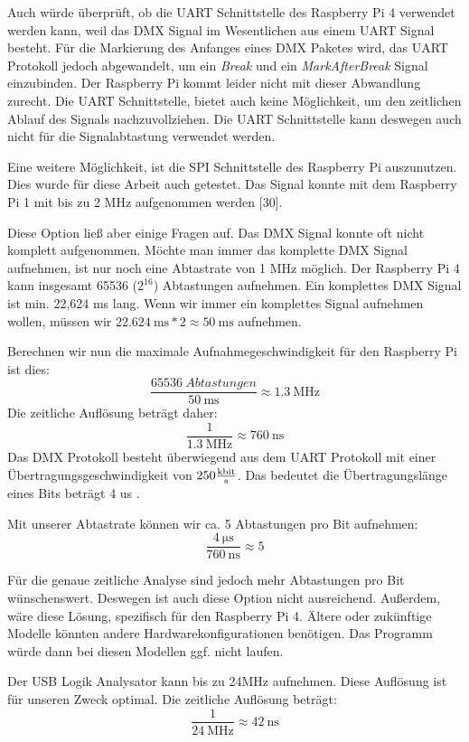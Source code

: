 Auch würde überprüft, ob die UART Schnittstelle des Raspberry Pi 4 verwendet werden kann, weil das DMX Signal im Wesentlichen aus einem UART Signal besteht. Für die Markierung des Anfanges eines DMX Paketes wird, das UART Protokoll jedoch abgewandelt, um ein \emph{Break} und ein \emph{MarkAfterBreak} Signal einzubinden. Der Raspberry Pi kommt leider nicht mit dieser Abwandlung zurecht\cite[S.20]{RaspberryPiDmxInterface}. Die UART Schnittstelle, bietet auch keine Möglichkeit, um den zeitlichen Ablauf des Signals nachzuvollziehen. Die UART Schnittstelle kann deswegen auch nicht für die Signalabtastung verwendet werden.

Eine weitere Möglichkeit, ist die SPI Schnittstelle des Raspberry Pi auszunutzen. Dies wurde für diese Arbeit auch getestet. Das Signal konnte mit dem Raspberry Pi 1 mit bis zu 2 MHz aufgenommen werden \cite{RaspberryPiDmxInterface}[30].

Diese Option ließ aber einige Fragen auf. Das DMX Signal konnte oft nicht komplett aufgenommen. Möchte man immer das komplette DMX Signal aufnehmen, ist nur noch eine Abtastrate von 1 MHz möglich. Der Raspberry Pi 4 kann insgesamt 65536 ($2^{16}$) Abtastungen aufnehmen. Ein komplettes DMX Signal ist min. 22,624 ms lang\cite{DMXWikiTiming}. Wenn wir immer ein komplettes Signal aufnehmen wollen, müssen wir $  \SI{22.624}{\ms}
 * 2 \approx \SI{50}{\ms}$ aufnehmen.



Berechnen wir nun die maximale Aufnahmegeschwindigkeit für den Raspberry Pi ist dies:
\[\frac{\SI{65536}{Abtastungen}}{\SI{50}{\ms}} \approx \SI{1.3}{\mega\hertz}\]
Die zeitliche Auflösung beträgt daher:
\[ \frac{1}{\SI{1.3}{\mega\hertz}} \approx \SI{760}{\ns}\]
Das DMX Protokoll besteht überwiegend aus dem UART Protokoll mit einer Übertragungsgeschwindigkeit von $250 \frac{\SI{}{\kilo\bit}}{\SI{}{\s}}$. Das bedeutet die Übertragungslänge eines Bits beträgt 4 us \cite{DMXWikiTiming}.

Mit unserer Abtastrate können wir ca. 5 Abtastungen pro Bit aufnehmen:
\[\frac{\SI{4}{\us}}{\SI{760}{\ns}} \approx 5\]

Für die genaue zeitliche Analyse sind jedoch mehr Abtastungen pro Bit wünschenswert. Deswegen ist auch diese Option nicht ausreichend. Außerdem, wäre diese Lösung, spezifisch für den Raspberry Pi 4. Ältere oder zukünftige Modelle könnten andere Hardwarekonfigurationen benötigen. Das Programm würde dann bei diesen Modellen ggf. nicht laufen.

Der USB Logik Analysator kann bis zu 24MHz aufnehmen. Diese Auflösung ist für unseren Zweck optimal. Die zeitliche Auflösung beträgt:
\[ \frac{1}{\SI{24}{\mega\hertz}} \approx \SI{42}{\ns}\]

